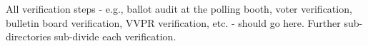 All verification steps -\/ e.\+g., ballot audit at the polling booth, voter verification, bulletin board verification, V\+V\+PR verification, etc. -\/ should go here. Further sub-\/directories sub-\/divide each verification. 